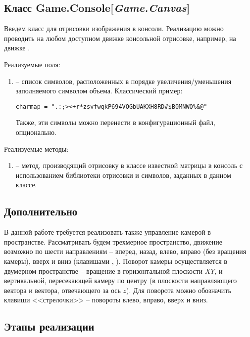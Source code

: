 \subsection{Класс Game.Console[\textit{Game.Canvas}]}
	
	Введем класс для отрисовки изображения в консоли. Реализацию можно проводить на любом доступном движке консольной отрисовке, например, на движке .

	\noindent Реализуемые поля:
	\begin{enumerate}
		\item {} -- список символов, расположенных в порядке увеличения/уменьшения заполняемого символом объема.
		Классический пример:
\begin{lstlisting}
charmap = ".:;><+r*zsvfwqkP694VOGbUAKXH8RD#$B0MNWQ%&@"
\end{lstlisting}
		Также, эти символы можно перенести в конфигурационный файл, опционально.
	\end{enumerate}

	\noindent Реализуемые методы:
	\begin{enumerate}
		\item {} -- метод, производящий отрисовку в классе  известной матрицы  в консоль с использованием библиотеки отрисовки и символов, заданных в данном классе.
	\end{enumerate}


\subsection{Дополнительно}

	В данной работе требуется реализовать также управление камерой в пространстве. Рассматривать будем трехмерное пространство, движение возможно по шести направлениям -- вперед, назад, влево, вправо (без вращения камеры), вверх и вниз (клавишами , ). Поворот камеры осуществляется в двумерном пространстве -- вращение в горизонтальной плоскости \( XY \), и вертикальной, пересекающей камеру по центру (в плоскости направляющего вектора и вектора, отвечающего за ось $z$). Для поворота можно обозначить клавиши <<стрелочки>> -- повороты влево, вправо, вверх и вниз.


\subsection{Этапы реализации}

